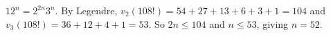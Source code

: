 $12^n=2^{2n}3^n$. By Legendre, $v_2(108!)=54+27+13+6+3+1=104$ and $v_3(108!)=36+12+4+1=53$. So $2n\le104$ and $n\le53$, giving $n=\boxed{52}$.
